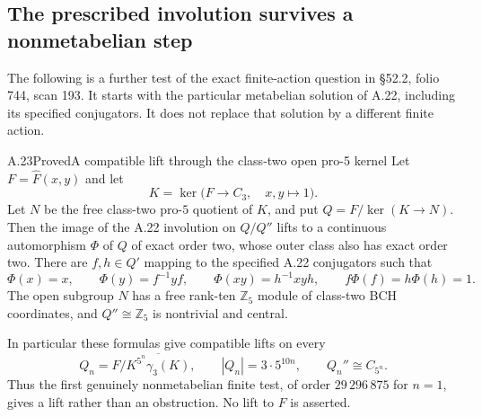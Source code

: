 \subsection{The prescribed involution survives a nonmetabelian step}

The following is a further test of the exact finite-action question
in \S52.2, folio 744, scan 193. It starts with the particular
metabelian solution of A.22, including its specified conjugators.
It does not replace that solution by a different finite action.

\begin{statement}{A.23}{Proved}{A compatible lift through the class-two open pro-5 kernel}
Let $F=\widehat F(x,y)$ and let
\[
 K=\ker\bigl(F\longrightarrow C_3,\quad x,y\longmapsto1\bigr).
\]
Let $N$ be the free class-two pro-$5$ quotient of $K$, and put
$Q=F/\ker(K\to N)$. Then the image of the A.22 involution
on $Q/Q''$ lifts to a continuous automorphism $\Phi$
of $Q$ of exact order two, whose outer class also has
exact order two. There are $f,h\in Q'$ mapping
to the specified A.22 conjugators such that
\[
 \Phi(x)=x,\qquad \Phi(y)=f^{-1}yf,\qquad
 \Phi(xy)=h^{-1}xyh,\qquad
 f\Phi(f)=h\Phi(h)=1.
\]
The open subgroup $N$ has a free rank-ten $\mathbb Z_5$
module of class-two BCH coordinates, and
$Q''\cong\mathbb Z_5$ is nontrivial and central.

In particular these formulas give compatible lifts on every
\[
 Q_n=F/\overline{K^{5^n}\gamma_3(K)},\qquad
 |Q_n|=3\cdot5^{10n},\qquad Q_n''\cong C_{5^n}.
\]
Thus the first genuinely nonmetabelian finite test, of order
$29\,296\,875$ for $n=1$, gives a lift rather than an
obstruction. No lift to $F$ is asserted.
\end{statement}
